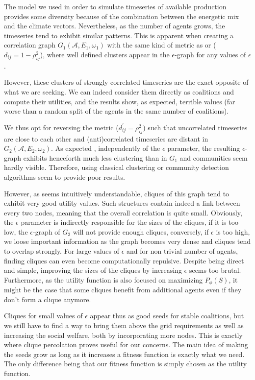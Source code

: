 \documentclass[conference]{IEEEtran}
\begin{document}
The model we used in order to simulate timeseries of available production provides some diversity because of the combination between the energetic mix and the climate vectors. Nevertheless, as the number of agents grows, the timeseries tend to exhibit similar patterns. This is apparent when creating a correlation graph $ G_{1}(\mathcal{A},E_{1},\omega_{1}) $ with the same kind of metric as \cite{Garas2008} or \cite{Onnela2004} ($ d_{ij} = 1 - \rho_{ij}^{2} $), where well defined clusters appear in the $ \epsilon $-graph for any values of $ \epsilon $. 

However, these clusters of strongly correlated timeseries are the exact opposite of what we are seeking. We can indeed consider them directly as coalitions and compute their utilities, and the results show, as expected, terrible values (far worse than a random split of the agents in the same number of coalitions).

We thus opt for reversing the metric ($ d_{ij}^{'} = \rho_{ij}^{2} $) such that uncorrelated timeseries are close to each other and (anti)correlated timeseries are distant in $ G_{2}(\mathcal{A},E_{2},\omega_{2}) $. As expected \cite{Onnela2004}, independently of the $ \epsilon $ parameter, the resulting $ \epsilon $-graph exhibits henceforth much less clustering than in $ G_{1} $ and communities seem hardly visible. Therefore, using classical clustering or community detection algorithms seem to provide poor results. 

However, as seems intuitively understandable, cliques of this graph tend to exhibit very good utility values. Such  structures contain indeed a link between every two nodes, meaning that the overall correlation is quite small. Obviously, the $ \epsilon $ parameter is indirectly responsible for the sizes of the cliques, if it is too low, the $\epsilon$-graph of $ G_{2} $ will not provide enough cliques, conversely, if $\epsilon $ is too high, we loose important information as the graph becomes very dense and cliques tend to overlap strongly. For large values of $ \epsilon $ and for non trivial number of agents, finding cliques can even become computationally repulsive. Despite being direct and simple, improving the sizes of the cliques by increasing $ \epsilon $ seems too brutal. Furthermore, as the utility function is also focused on maximizing $ P_{\phi}(S) $, it might be the case that some cliques benefit from additional agents even if they don't form a clique anymore.

Cliques for small values of $ \epsilon $ appear thus as good seeds for stable coalitions, but we still have to find a way to bring them above the grid requirements as well as increasing the social welfare, both by incorporating more nodes. This is exactly where clique percolation proves useful for our concerns. The main idea of making the seeds grow as long as it increases a fitness function is exactly what we need. The only difference being that our fitness function is simply chosen as the utility function.  
\end{document}

